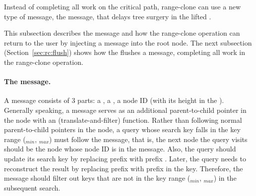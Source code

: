Instead of completing all work on the critical path, range-clone can use a
new type of message, the \goto message, that delays tree surgery
in the lifted \bedag.

This subsection describes the \goto message and how the range-clone operation
can return to the user by injecting a \goto message into the root node.
The next subsection (Section~\ref{sec:rc:flush}) shows how the \bet flushes
a \goto message,
completing all work in the range-clone operation.

\paragraph{The \goto message.}
A \goto message consists of 3 parts: a \dpre, a \spre, a node ID
(with its height in the \bedag).
Generally speaking, a \goto message serves as an additional parent-to-child
pointer in the \bet node with an \xf (translate-and-filter) function.
Rather than following normal parent-to-child pointers in the node,
a query whose search key falls in the key range (\dpre$_{min}$, \dpre$_{max}$)
must follow the \goto message, that is, the next node the query visits
should be the node whose node ID is in the \goto message.
Also, the query should update its search key by replacing prefix \dpre with
prefix \spre.
Later, the query needs to reconstruct the result by replacing prefix \spre
with prefix \dpre in the key.
Therefore, the \goto message should filter out keys that are not in the
key range (\spre$_{min}$, \spre$_{max}$) in the subsequent search.

